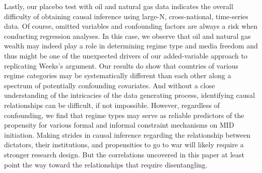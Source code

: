 \documentclass[12pt]{article}
\begin{document}
\par Lastly, our placebo test with oil and natural gas data indicates the overall difficulty of obtaining causal inference using large-N, cross-national, time-series data. Of course, omitted variables and confounding factors are always a risk when conducting regression analyses. In this case, we observe that oil and natural gas wealth may indeed play a role in determining regime type and media freedom and thus might be one of the unexpected drivers of our added-variable approach to replicating Weeks's argument. Our results do show that countries of various regime categories may be systematically different than each other along a spectrum of potentially confounding covariates. And without a close understanding of the intricacies of the data generating process, identifying causal relationships can be difficult, if not impossible. However, regardless of confounding, we find that regime types may serve as reliable predictors of the propensity for various formal and informal constraint mechanisms on MID initiation. Making strides in causal inference regarding the relationship between dictators, their institutions, and propensities to go to war will likely require a stronger research design. But the correlations uncovered in this paper at least point the way toward the relationships that require disentangling. 

\pagebreak

\printbibliography
\end{document}

